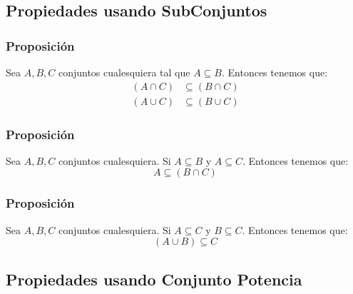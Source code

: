 \documentclass[12pt]{report}                                    %
\begin{document}
        \subsection{Propiedades usando SubConjuntos}
            
            \subsubsection{Proposición}
                Sea $A, B, C$ conjuntos cualesquiera tal que $A \subseteq B$. Entonces tenemos que:
                \begin{equation*}
                \begin{split}
                    (A \cap C) &\subseteq (B \cap C)        \\
                    (A \cup C) &\subseteq (B \cup C)
                \end{split}
                \end{equation*}

            \subsubsection{Proposición}
                Sea $A, B, C$ conjuntos cualesquiera. Si $A \subseteq B$ y $A \subseteq C$.
                Entonces tenemos que:
                \begin{equation*}
                    A \subseteq (B \cap C)
                \end{equation*}

            \subsubsection{Proposición}
                Sea $A, B, C$ conjuntos cualesquiera. Si $A \subseteq C$ y $B \subseteq C$.
                Entonces tenemos que:
                \begin{equation*}
                    (A \cup B) \subseteq C
                \end{equation*}


        \clearpage
        \subsection{Propiedades usando Conjunto Potencia}
            
\end{document}
